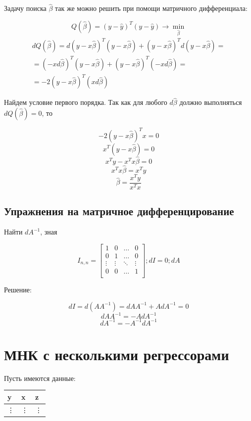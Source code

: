 \documentclass[12pt]{article} %
\theoremstyle{definition} %
\def \hb{\hat{\beta}}
\def \hy{\hat{y}}
\begin{document}
Задачу поиска $\hb$ так же можно решить при помощи матричного дифференциала:

\[
Q(\hb) = \left( y-\hy\right)^T\left( y-\hy\right) \rightarrow \underset{\hb}{\min}
\]
\begin{eqnarray*}
dQ(\hb) = d( y-x\hb)^T( y-x\hb) + ( y-x\hb)^Td( y-x\hb) = \\
=(-xd\hb)^T( y-x\hb) + (y-x\hb)^T(-xd\hb)=\\
=-2(y-x\hb)^T(xd\hb)
\end{eqnarray*}

Найдем условие первого порядка. Так как для любого $d\hb$ должно выполняться $dQ(\hb)=0$, то

\[
-2(y-x\hb)^Tx = 0
\]
\[
x^T(y-x\hb) = 0
\]
\[
x^Ty-x^Tx\hb = 0
\]
\[
x^Tx\hb = x^Ty
\]
\[
\hb = \frac{x^Ty}{x^Tx}
\]

\subsection{Упражнения на матричное дифференцирование}

Найти $dA^{-1}$, зная

\[
I_{n,n} =  \begin{bmatrix}
           1 & 0 & \hdots & 0 \\
           0 & 1 & \hdots & 0 \\
           \vdots & \vdots & \ddots & \vdots \\
            0 & 0 & \hdots & 1 \\
         \end{bmatrix};
dI = 0;
dA
\]

Решение:

\[
dI = d(AA^{-1}) = dAA^{-1} + AdA^{-1} = 0
\]
\[
dAA^{-1} = -AdA^{-1}
\]
\[
dA^{-1} = -A^{-1}dA^{-1}
\]

\section{МНК с несколькими регрессорами}

Пусть имеются данные:

\begin{center}
    \begin{tabular}{lll}
    \toprule
    y & x & z \\
    \midrule
    \vdots & \vdots & \vdots \\
    \bottomrule
    \end{tabular}
\end{center}
\end{document}
